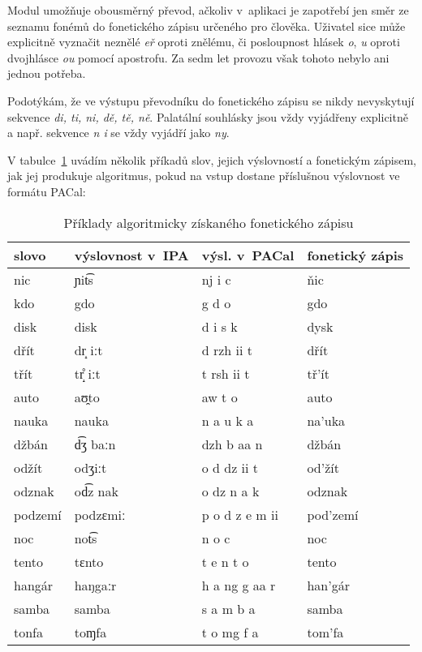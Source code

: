 Modul umožňuje obousměrný převod, ačkoliv v~aplikaci je zapotřebí jen směr ze seznamu fonémů do
fonetického zápisu určeného pro člověka. Uživatel sice může explicitně vyznačit
neznělé {\em eř} oproti znělému, či posloupnost hlásek {\em o}, {\em u} oproti
dvojhlásce {\em ou} pomocí apostrofu. Za sedm let provozu však tohoto nebylo ani
jednou potřeba.

Podotýkám, že ve výstupu převodníku do fonetického zápisu se nikdy nevyskytují
sekvence {\em di, ti, ni, dě, tě, ně}. Palatální souhlásky jsou vždy vyjádřeny
explicitně a např. sekvence {\em n i} se vždy vyjádří jako {\em ny}.

V tabulce~\ref{tab:priklady-fonetiky} uvádím několik příkadů slov, jejich výslovností a fonetickým zápisem, jak jej
produkuje algoritmus, pokud na vstup dostane příslušnou výslovnost ve formátu
PACal:

\begin{table}[htpb]
\begin{center}
\begin{tabular}{|l|l|l|l}
\hline
slovo & výslovnost v~IPA & výsl. v~PACal & fonetický zápis \\
\hline
nic & ɲit͡s  & nj i c & ňic \\
kdo & gdo & g d o & gdo \\
disk & disk & d i s k & dysk \\
dřít & dr̝ iːt & d rzh ii t & dřít \\
třít & tr̝̊ iːt & t rsh ii t & tř'ít \\
auto & aʊ̯to & aw t o & auto \\
nauka & nauka & n a u k a & na'uka \\
džbán & d͡ʒ baːn  & dzh b aa n & džbán \\
odžít & odʒiːt & o d dz ii t & od'žít \\
odznak & od͡z nak  & o dz n a k & odznak \\
podzemí & podzɛmiː & p o d z e m ii & pod'zemí \\
noc & not͡s  & n o c & noc \\
tento & tɛnto & t e n t o & tento \\
hangár & haŋgaːr & h a ng g aa r & han'gár \\
samba & samba & s a m b a & samba \\
tonfa & toɱfa & t o mg f a & tom'fa \\
\hline
\end{tabular}
\caption{Příklady algoritmicky získaného fonetického zápisu}\label{tab:priklady-fonetiky}
\end{center}
\end{table}

